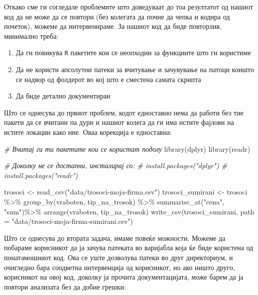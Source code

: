 \documentclass[
]{book}
\newenvironment{Shaded}{\begin{snugshade}}{\end{snugshade}}
\newcommand{\AttributeTok}[1]{\textcolor[rgb]{0.77,0.63,0.00}{#1}}
\newcommand{\CommentTok}[1]{\textcolor[rgb]{0.56,0.35,0.01}{\textit{#1}}}
\newcommand{\FunctionTok}[1]{\textcolor[rgb]{0.00,0.00,0.00}{#1}}
\newcommand{\NormalTok}[1]{#1}
\newcommand{\OtherTok}[1]{\textcolor[rgb]{0.56,0.35,0.01}{#1}}
\newcommand{\SpecialCharTok}[1]{\textcolor[rgb]{0.00,0.00,0.00}{#1}}
\newcommand{\StringTok}[1]{\textcolor[rgb]{0.31,0.60,0.02}{#1}}
\begin{document}
Откако сме ги согледале проблемите што доведуваат до тоа резултатот од нашиот код да не може да се повтори (без колегата да почне да чепка и кодира од почеток), можеме да интервенираме. За нашиот код да биде повторлив, минимално треба:

\begin{enumerate}
\def\labelenumi{\arabic{enumi}.}
\item
  Да ги повикува \texttt{R} пакетите кои се неопходни за функциите што ги користиме
\item
  Да не користи апсолутни патеки за вчитување и зачувување на патоци коишто се надвор од фолдерот во кој што е сместена самата скрипта
\item
  Да биде детално документиран
\end{enumerate}

Што се однесува до првиот проблем, кодот едноставно нема да работи без тие пакети да се вчитани па дури и нашиот колега да ги има истите фајлови на истите локации како ние. Оваа корекција е едноставна:

\begin{Shaded}
\begin{Highlighting}[]
\CommentTok{\# Вчитај ги ти пакетите кои се користат подолу }
\FunctionTok{library}\NormalTok{(dplyr)}
\FunctionTok{library}\NormalTok{(readr)}

\CommentTok{\# Доколку не се достапни, инсталирај со:}
\CommentTok{\# install.packages("dplyr")}
\CommentTok{\# install.packages("readr")}

\NormalTok{trosoci }\OtherTok{\textless{}{-}} \FunctionTok{read\_csv}\NormalTok{(}\StringTok{"data/trosoci{-}moja{-}firma.csv"}\NormalTok{)}
\NormalTok{trosoci\_sumirani }\OtherTok{\textless{}{-}}\NormalTok{ trosoci }\SpecialCharTok{\%\textgreater{}\%} 
  \FunctionTok{group\_by}\NormalTok{(vraboten, tip\_na\_trosok) }\SpecialCharTok{\%\textgreater{}\%} 
  \FunctionTok{summarise\_at}\NormalTok{(}\StringTok{"cena"}\NormalTok{, }\StringTok{"sum"}\NormalTok{)}\SpecialCharTok{\%\textgreater{}\%} 
  \FunctionTok{arrange}\NormalTok{(vraboten, tip\_na\_trosok)}
\FunctionTok{write\_csv}\NormalTok{(trosoci\_sumirani, }
          \AttributeTok{path =} \StringTok{"data/trosoci{-}moja{-}firma{-}sumirani.csv"}\NormalTok{)}
\end{Highlighting}
\end{Shaded}

Што се однесува до втората задача, имаме повеќе можности. Можеме да побараме корисникот да ја зачува патеката во варијабла која ќе биде користена од понатамошниот код. Ова се уште дозволува патеки во друг директориум, и очигледно бара соодветна интервенција од корисникот, но ако ништо друго, корисникот на овој код, доколку ја прочита документацијата, може барем да ја повтори анализата без да добие грешки:
\end{document}
